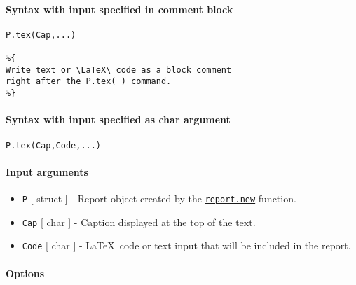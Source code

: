 


	\paragraph{Syntax with input specified in comment
block}\label{syntax-with-input-specified-in-comment-block}

\begin{verbatim}
P.tex(Cap,...)

%{
Write text or \LaTeX\ code as a block comment
right after the P.tex( ) command.
%}
\end{verbatim}

\paragraph{Syntax with input specified as char
argument}\label{syntax-with-input-specified-as-char-argument}

\begin{verbatim}
P.tex(Cap,Code,...)
\end{verbatim}

\paragraph{Input arguments}\label{input-arguments}

\begin{itemize}
\item
  \texttt{P} {[} struct {]} - Report object created by the
  \href{report/new}{\texttt{report.new}} function.
\item
  \texttt{Cap} {[} char {]} - Caption displayed at the top of the text.
\item
  \texttt{Code} {[} char {]} - \LaTeX~code or text input that will be
  included in the report.
\end{itemize}

\paragraph{Options}\label{options}

